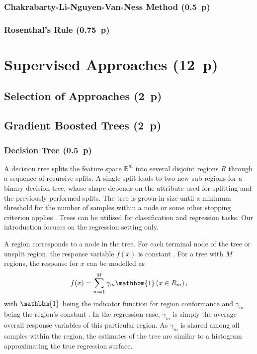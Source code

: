 \subsubsection{Chakrabarty-Li-Nguyen-Van-Ness
  Method (0.5~p)}\label{sec:chakarabarty-li-nguyen-van-ness-method}


\subsubsection{Rosenthal's Rule (0.75~p)}\label{sec:rosenthals-rule}

\newpage
\section{Supervised Approaches (12~p)}\label{sec:supervised-approaches}

\subsection{Selection of Approaches (2~p)}\label{sec:selection-of-approaches}

\subsection{Gradient Boosted Trees (2~p)}\label{sec:gradient-boosted-trees}

\subsubsection{Decision Tree (0.5~p)}\label{sec:decision-tree}

A decision tree splits the feature space $\mathbb{R}^m$ into several disjoint regions $R$ through a sequence of recursive splits. A single split leads to two new sub-regions for a binary decision tree, whose shape depends on the attribute used for splitting and the previously performed splits. The tree is grown in size until a minimum threshold for the number of samples within a node or some other stopping criterion applies \autocite{breimanClassificationRegressionTrees2017}.
Trees can be utilised for classification and regression tasks. Our introduction focuses on the regression setting only.

A region corresponds to a node in the tree. For each terminal node of the tree or unsplit region, the response variable $f(x)$ is constant \autocite{breimanClassificationRegressionTrees2017}. For a tree with $M$ regions, the response for $x$ can be modelled as
$$
  f(x)=\sum_{m=1}^{M} \gamma_{m} \mathbbm{1}\left(x \in R_{m}\right),
$$
with $\mathbbm{1}$ being the indicator function for region conformance and $\gamma_m$ being the region's constant \autocite{hastietrevorElementsStatisticalLearning2009}. In the regression case, $\gamma_m$ is simply the average overall response variables of this particular region. As $\gamma_m$ is shared among all samples within the region, the estimates of the tree are similar to a histogram approximating the true regression surface.

